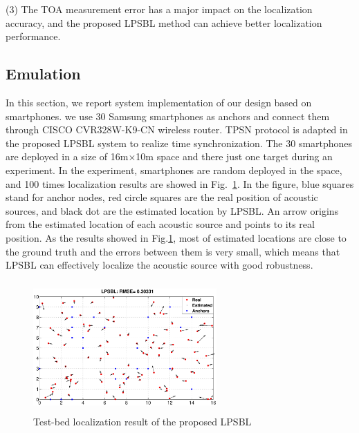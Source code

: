  (3) The TOA measurement error has a major impact on the localization accuracy, and the proposed LPSBL method can achieve better localization performance.



\subsection{Emulation}


In this section, we report system implementation of our design based on smartphones.
we use 30 Samsung smartphones as anchors and connect them through CISCO CVR328W-K9-CN wireless router. 
TPSN protocol is adapted in the proposed LPSBL system to realize time synchronization.
The 30 smartphones are deployed in a size of 16m$\times$10m space and there just one target during an experiment.
In the experiment, smartphones are random deployed in the space, and 100 times localization results are showed in Fig.~\ref{fig7}. 
In the figure, blue squares stand for anchor
nodes, red circle squares are the real position of acoustic sources, and black dot are the estimated location by LPSBL. An arrow origins from the estimated location of each acoustic source and points to its real position. 
As the results showed in Fig.\ref{fig7}, most of estimated locations are close to the ground truth and the errors between them is very small,
which means that LPSBL can effectively localize the acoustic source with good robustness.
  \begin{figure}[htb]
			    \vspace{-12mm}
            \includegraphics[height=5.0cm,width=7.0cm]{image/fig7.eps}
            \vspace{12mm}
            \caption{Test-bed localization result of the proposed LPSBL}
             \vspace{-5mm}
             \label{fig7}
        \end{figure}
